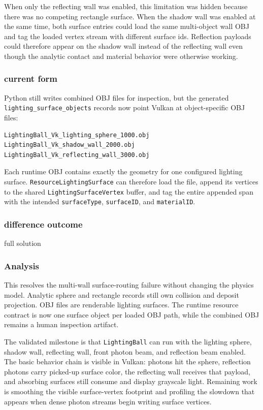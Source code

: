 When only the reflecting wall was enabled, this limitation was hidden because
there was no competing rectangle surface.  When the shadow wall was enabled at
the same time, both surface entries could load the same multi-object wall OBJ
and tag the loaded vertex stream with different surface ids.  Reflection
payloads could therefore appear on the shadow wall instead of the reflecting
wall even though the analytic contact and material behavior were otherwise
working.

\subsubsection{current form}

Python still writes combined OBJ files for inspection, but the generated
\texttt{lighting\_surface\_objects} records now point Vulkan at
object-specific OBJ files:
\begin{verbatim}
LightingBall_Vk_lighting_sphere_1000.obj
LightingBall_Vk_shadow_wall_2000.obj
LightingBall_Vk_reflecting_wall_3000.obj
\end{verbatim}
Each runtime OBJ contains exactly the geometry for one configured lighting
surface.  \texttt{ResourceLightingSurface} can therefore load the file, append
its vertices to the shared \texttt{LightingSurfaceVertex} buffer, and tag the
entire appended span with the intended \texttt{surfaceType},
\texttt{surfaceID}, and \texttt{materialID}.

\subsubsection{difference outcome}

full solution

\subsubsection{Analysis}

This resolves the multi-wall surface-routing failure without changing the
physics model.  Analytic sphere and rectangle records still own collision and
deposit projection.  OBJ files are renderable lighting surfaces.  The runtime
resource contract is now one surface object per loaded OBJ path, while the
combined OBJ remains a human inspection artifact.

The validated milestone is that \texttt{LightingBall} can run with the
lighting sphere, shadow wall, reflecting wall, front photon beam, and
reflection beam enabled.  The basic behavior chain is visible in Vulkan:
photons hit the sphere, reflection photons carry picked-up surface color, the
reflecting wall receives that payload, and absorbing surfaces still consume
and display grayscale light.  Remaining work is smoothing the visible
surface-vertex footprint and profiling the slowdown that appears when dense
photon streams begin writing surface vertices.

